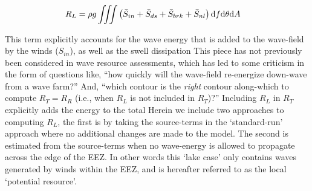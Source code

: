 \begin{align}
  R_L &= \rho g \iiint \left ( \bar{S}_{in} + \bar{S}_{ds} + \bar{S}_{brk} + \bar{S}_{nl} \right ) \mathrm{d} f \mathrm{d} \theta \mathrm{d} A
\end{align}

This term explicitly accounts for the wave energy that is added to the wave-field by the winds ($S_{in}$), as well as the swell dissipation 
This piece has not previously been considered in wave resource assessments, which has led to some criticism in the form of questions like, ``how quickly will the wave-field re-energize down-wave from a wave farm?''  And, ``which contour is the {\em right} contour along-which to compute $R_T = R_R$ (i.e., when $R_L$ is not included in $R_T$)?'' Including $R_L$ in $R_T$ explicitly adds the energy to the total 
Herein we include two approaches to computing $R_L$, the first is by taking the source-terms in the `standard-run' approach where no additional changes are made to the model. The second is estimated from the source-terms when no wave-energy is allowed to propagate across the edge of the EEZ. In other words this `lake case' only contains waves generated by winds within the EEZ, and is hereafter referred to as the local `potential resource'. 


